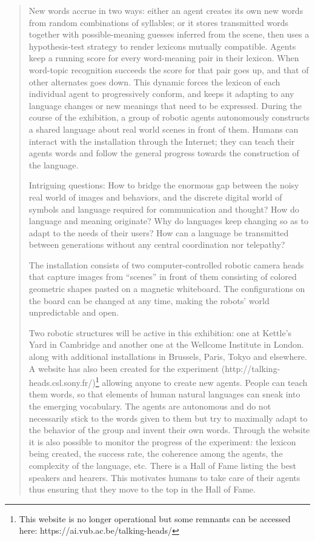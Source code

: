 \begin{quotation}
New words accrue in two ways: either an agent creates its own new words from random combinations of syllables; or it stores transmitted words together with possible-meaning guesses inferred from the scene, then uses a hypothesis-test strategy to render lexicons mutually compatible. Agents keep a running score for every word-meaning pair in their lexicon. When word-topic recognition succeeds the score for that pair goes up, and that of other alternates goes down. This dynamic forces the lexicon of each individual agent to progressively conform, and keeps it adapting to any language changes or new meanings that need to be expressed. During the course of the exhibition, a group of robotic agents autonomously constructs a shared language about real world scenes in front of them. Humans can interact with the installation through the Internet; they can teach their agents words and follow the general progress towards the construction of the language.

Intriguing questions: How to bridge the enormous gap between the noisy real world of images and behaviors, and the discrete digital world of symbols and language required for communication and thought? How do language and meaning originate? Why do languages keep changing so as to adapt to the needs of their users? How can a language be transmitted between generations without any central coordination nor telepathy?

The installation consists of two computer-controlled robotic camera heads that capture images from ``scenes'' in front of them consisting of colored geometric shapes pasted on a magnetic whiteboard. The configurations on the board can be changed at any time, making the robots' world unpredictable and open.

Two robotic structures will be active in this exhibition: one at Kettle's Yard in Cambridge and another one at the Wellcome Institute in London. along with additional installations in Brussels, Paris, Tokyo and elsewhere. A website has also been created for the experiment (http://talking-heads.csl.sony.fr/)\footnote{This website is no longer operational but some remnants can be accessed here: 
https://ai.vub.ac.be/talking-heads/} 
allowing anyone to create new agents. People can teach them words, so that elements of human natural languages can sneak into the emerging vocabulary. The agents are autonomous and do not necessarily stick to the words given to them but try to maximally adapt to the behavior of the group and invent their own words. Through the website it is also possible to monitor the progress of the experiment: the lexicon being created, the success rate, the coherence among the agents, the complexity of the language, etc. There is a Hall of Fame listing the best speakers and hearers. This motivates humans to take care of their agents thus ensuring that they move to the top in the Hall of Fame.


\end{quotation}
